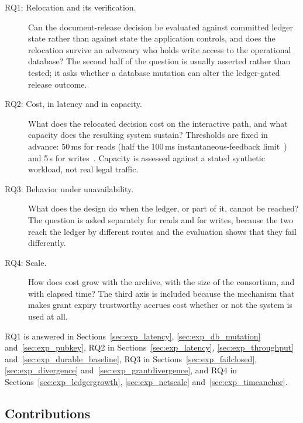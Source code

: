 \documentclass[preprint,12pt]{elsarticle}
\begin{document}
\begin{description}

\item[RQ1: Relocation and its verification.] Can the document-release
decision be evaluated against committed ledger state rather than against state
the application controls, and does the relocation survive an adversary who
holds write access to the operational database? The second half of the question
is usually asserted rather than tested; it asks whether a database mutation can
alter the ledger-gated release outcome.

\item[RQ2: Cost, in latency and in capacity.] What does the relocated
decision cost on the interactive path, and what capacity does the resulting
system sustain? Thresholds are fixed in advance: 50\,ms for reads (half the
100\,ms instantaneous-feedback limit~\cite{nielsen1993usability}) and 5\,s
for writes~\cite{miller1968response,nielsen1993usability}. Capacity is
assessed against a stated synthetic workload, not real legal traffic.

\item[RQ3: Behavior under unavailability.] What does the design do when the
ledger, or part of it, cannot be reached? The question is asked separately for
reads and for writes, because the two reach the ledger by different routes and
the evaluation shows that they fail differently.

\item[RQ4: Scale.] How does cost grow with the archive, with the size of the
consortium, and with elapsed time? The third axis is included because the
mechanism that makes grant expiry trustworthy accrues cost whether or not the
system is used at all.

\end{description}

RQ1 is answered in Sections~\ref{sec:exp_latency},
\ref{sec:exp_db_mutation} and~\ref{sec:exp_pubkey}, RQ2 in
Sections~\ref{sec:exp_latency}, \ref{sec:exp_throughput}
and~\ref{sec:exp_durable_baseline}, RQ3 in Sections~\ref{sec:exp_failclosed},
\ref{sec:exp_divergence} and~\ref{sec:exp_grantdivergence}, and RQ4 in
Sections~\ref{sec:exp_ledgergrowth}, \ref{sec:exp_netscale}
and~\ref{sec:exp_timeanchor}.


\subsection{Contributions}
\label{sec:contributions}
\end{document}
